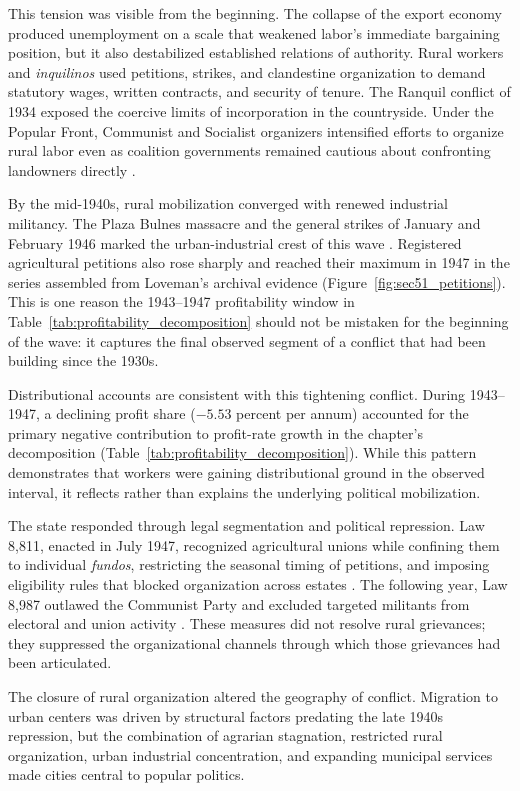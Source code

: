 This tension was visible from the beginning. The collapse of the export economy produced unemployment on a scale that weakened labor's immediate bargaining position, but it also destabilized established relations of authority. Rural workers and \emph{inquilinos} used petitions, strikes, and clandestine organization to demand statutory wages, written contracts, and security of tenure. The Ranquil conflict of 1934 exposed the coercive limits of incorporation in the countryside. Under the Popular Front, Communist and Socialist organizers intensified efforts to organize rural labor even as coalition governments remained cautious about confronting landowners directly \citep{Loveman1976}.

By the mid-1940s, rural mobilization converged with renewed industrial militancy. The Plaza Bulnes massacre and the general strikes of January and February 1946 marked the urban-industrial crest of this wave \citep{BravoVargas2017}. Registered agricultural petitions also rose sharply and reached their maximum in 1947 in the series assembled from Loveman's archival evidence (Figure~\ref{fig:sec51_petitions}). This is one reason the 1943--1947 profitability window in Table~\ref{tab:profitability_decomposition} should not be mistaken for the beginning of the wave: it captures the final observed segment of a conflict that had been building since the 1930s.

Distributional accounts are consistent with this tightening conflict. During 1943--1947, a declining profit share ($-5.53$ percent per annum) accounted for the primary negative contribution to profit-rate growth in the chapter's decomposition (Table~\ref{tab:profitability_decomposition}). While this pattern demonstrates that workers were gaining distributional ground in the observed interval, it reflects rather than explains the underlying political mobilization.

The state responded through legal segmentation and political repression. Law 8,811, enacted in July 1947, recognized agricultural unions while confining them to individual \emph{fundos}, restricting the seasonal timing of petitions, and imposing eligibility rules that blocked organization across estates \citep{Chile1947}. The following year, Law 8,987 outlawed the Communist Party and excluded targeted militants from electoral and union activity \citep{Chile1948}. These measures did not resolve rural grievances; they suppressed the organizational channels through which those grievances had been articulated.

The closure of rural organization altered the geography of conflict. Migration to urban centers was driven by structural factors predating the late 1940s repression, but the combination of agrarian stagnation, restricted rural organization, urban industrial concentration, and expanding municipal services made cities central to popular politics.

